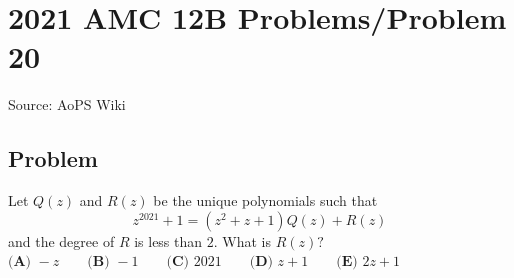 \documentclass[12pt]{article}
\begin{document}
\section*{{2021 AMC 12B Problems/Problem 20}}
Source: AoPS Wiki

\subsection*{Problem}
Let $Q(z)$ and $R(z)$ be the unique polynomials such that \[z^{2021}+1=(z^2+z+1)Q(z)+R(z)\] and the degree of $R$ is less than $2.$ What is $R(z)?$ $\textbf{(A) }{-}z \qquad \textbf{(B) }{-}1 \qquad \textbf{(C) }2021\qquad \textbf{(D) }z+1 \qquad \textbf{(E) }2z+1$
\end{document}
